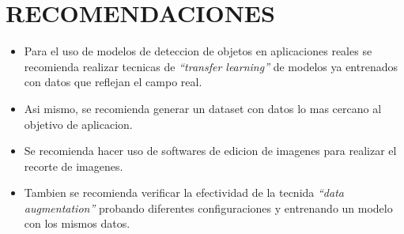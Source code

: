 \chapter*{RECOMENDACIONES}

\begin{itemize}
  \item Para el uso de modelos de deteccion de objetos en aplicaciones reales se recomienda realizar tecnicas de \textit{``transfer learning''} de modelos ya entrenados con datos que reflejan el campo real.
  \item Asi mismo, se recomienda generar un dataset con datos lo mas cercano al objetivo de aplicacion.
  \item Se recomienda hacer uso de softwares de edicion de imagenes para realizar el recorte de imagenes.
  \item Tambien se recomienda verificar la efectividad de la tecnida \textit{``data augmentation''} probando diferentes configuraciones y entrenando un modelo con los mismos datos.
\end{itemize}